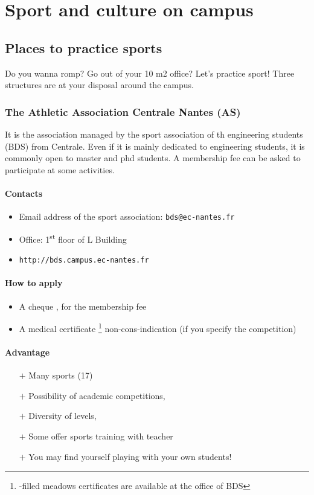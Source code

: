 \section{Sport and culture on campus}
\subsection {Places to practice sports}
Do you wanna romp? Go out of your 10 m2 office?  Let's practice sport! Three structures are at your disposal around the campus.

\subsubsection{The Athletic Association Centrale Nantes (AS)}
It is the association managed by the sport association of th engineering students (BDS) from Centrale. Even if it is mainly dedicated to engineering students, it is commonly open to master and phd students. A membership fee can be asked to participate at some activities.
\paragraph{Contacts}
\begin{itemize}
  \item Email address of the sport association: \texttt{bds@ec-nantes.fr}
  \item Office: 1\textsuperscript{st} floor of L Building
  \item \texttt{http://bds.campus.ec-nantes.fr}
\end {itemize}
\paragraph{How to apply}
\begin{itemize}
  \item A cheque , for the membership fee
  \item A medical certificate \footnote{-filled meadows certificates are available at the office of BDS} non-cons-indication (if you specify the competition)
\end{itemize}

\paragraph{Advantage}
\begin{itemize}
  \item [$+$] Many sports (17)
  \item [$+$] Possibility of academic competitions,
  \item [$+$] Diversity of levels,
  \item [$+$] Some offer sports training with teacher
  \item [$+$] You may find yourself playing with your own students!
\end{itemize}
